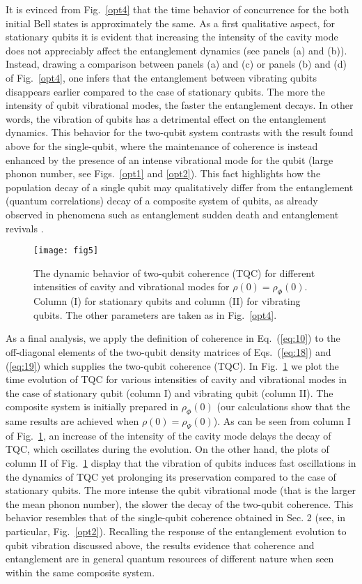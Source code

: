 \documentclass[twocolumn,3p,times]{elsarticle}
\begin{document}
It is evinced from Fig.~\ref{opt4} that the time behavior of concurrence for the both initial Bell states is approximately the same. As a first qualitative aspect, for stationary qubits it is evident that increasing the intensity of the cavity mode does not appreciably affect the entanglement dynamics (see panels (a) and (b)). Instead, drawing a comparison between panels (a) and (c) or panels (b) and (d) of Fig.~\ref{opt4}, one infers that the entanglement between vibrating qubits disappears earlier compared to the case of stationary qubits. The more the intensity of qubit vibrational modes, the faster the entanglement decays. In other words, the vibration of qubits has a detrimental effect on the entanglement dynamics. This behavior for the two-qubit system contrasts with the result found above for the single-qubit, where the maintenance of coherence is instead enhanced by the presence of an intense vibrational mode for the qubit (large phonon number, see Figs.~\ref{opt1} and \ref{opt2}). This fact highlights how the population decay of a single qubit may qualitatively differ from the entanglement (quantum correlations) decay of a composite system of qubits, as already observed in phenomena such as entanglement sudden death \cite{eberlyScience2007} and entanglement revivals \cite{lofrancoreview}.   

\begin{figure}[t!]
\texttt{[image: fig5]}
\caption{The dynamic behavior of two-qubit coherence (TQC) for different intensities of cavity and vibrational modes for $\rho(0)=\rho_{\Phi}(0)$. Column (I) for stationary qubits and column (II) for vibrating qubits. The other parameters are taken as in Fig.~\ref{opt4}.}    
\label{opt5}
\end{figure}

As a final analysis, we apply the definition of coherence in Eq.~(\ref{eq:10}) to the off-diagonal elements of the two-qubit density matrices of Eqs.~(\ref{eq:18}) and (\ref{eq:19}) which supplies the two-qubit coherence (TQC). 
In Fig.~\ref{opt5} we plot the time evolution of TQC for various intensities of cavity and vibrational modes in the case of stationary qubit (column I) and vibrating qubit (column II). The composite system is initially prepared in $\rho_{\Phi}(0)$ (our calculations show that the same results are achieved when $\rho(0)=\rho_{\Psi}(0)$). As can be seen from column I of Fig.~\ref{opt5}, an increase of the intensity of the cavity mode delays the decay of TQC, which oscillates during the evolution. On the other hand, the plots of column II of Fig.~\ref{opt5} display that the vibration of qubits induces fast oscillations in the dynamics of TQC yet prolonging its preservation compared to the case of stationary qubits. The more intense the qubit vibrational mode (that is the larger the mean phonon number), the slower the decay of the two-qubit coherence. This behavior resembles that of the single-qubit coherence obtained in Sec. 2 (see, in particular, Fig.~\ref{opt2}). Recalling the response of the entanglement evolution to qubit vibration discussed above, the results evidence that coherence and entanglement are in general quantum resources of different nature when seen within the same composite system.
\end{document}
